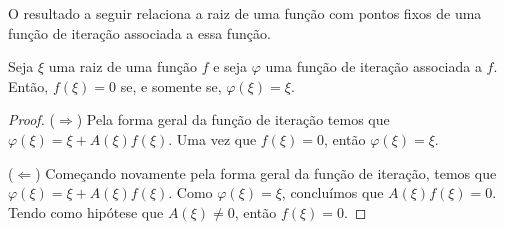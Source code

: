 O resultado a seguir relaciona a raiz de uma função com pontos fixos de uma função de iteração associada a essa função. 

\begin{prop}
Seja $\xi$ uma raiz de uma função $f$ e seja $\varphi$ uma função de iteração associada a $f$. Então, $f(\xi) = 0$ se, e somente se, $\varphi(\xi) = \xi$.
\end{prop}


\begin{proof}
($\Rightarrow$) Pela forma geral da função de iteração temos que $\varphi(\xi) = \xi + A(\xi)f(\xi)$. Uma vez que $f(\xi) = 0$, então $\varphi(\xi) = \xi$.

($\Leftarrow$) Começando novamente pela forma geral da função de iteração, temos que $\varphi(\xi) = \xi + A(\xi)f(\xi)$. Como $\varphi(\xi) = \xi$, concluímos que $A(\xi) f(\xi) = 0$. Tendo como hipótese que $A(\xi) \neq 0$, então $f(\xi) = 0$.
\end{proof}



